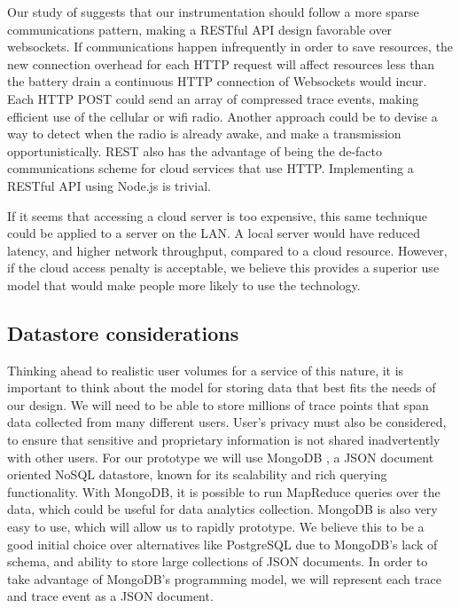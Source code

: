 Our study of \cite{PeriodicTransfers} suggests that
our instrumentation should follow a more sparse communications pattern, making
a RESTful API\cite{REST} design favorable over websockets. If communications
happen infrequently in order to save resources, the new connection overhead for
each HTTP request will affect resources less than the battery
drain a continuous HTTP connection of Websockets would incur.
Each HTTP POST could send an array of compressed trace events, making
efficient use of the cellular or wifi radio. Another approach could be to 
devise a way to detect when the radio is already awake, and make a transmission
opportunistically. REST also has the advantage of being the de-facto communications
scheme for cloud services that use HTTP. Implementing a RESTful API using Node.js is trivial.

If it seems that accessing a cloud server is too expensive, this same technique could
be applied to a server on the LAN. A local server would have reduced latency, and higher network throughput,
compared to a cloud resource. However, if the cloud access penalty is acceptable, we believe this provides
a superior use model that would make people more likely to use the technology. 

\subsection{Datastore considerations}
Thinking ahead to realistic user volumes for a service of this nature, it is
important to think about the model for storing data that best fits the 
needs of our design. We will need to be able to store millions of trace points
that span data collected from many different users. User's privacy must also be
considered, to ensure that sensitive and proprietary information is not shared
inadvertently with other users. For our prototype we will use MongoDB \cite{MongoDB}, a 
JSON \cite{JSON} document oriented NoSQL datastore, known for its scalability and rich
querying functionality. With MongoDB, it is possible to run MapReduce \cite{MapReduce}
queries over the data, which could be useful for data analytics collection.
MongoDB is also very easy to use, which will allow us to rapidly prototype.
We believe this to be a good initial choice over alternatives like PostgreSQL \cite{Postgres}
due to MongoDB's lack of schema, and ability to store large collections of JSON documents. 
In order to take advantage of MongoDB's programming model, we will represent 
each trace and trace event as a JSON document.

